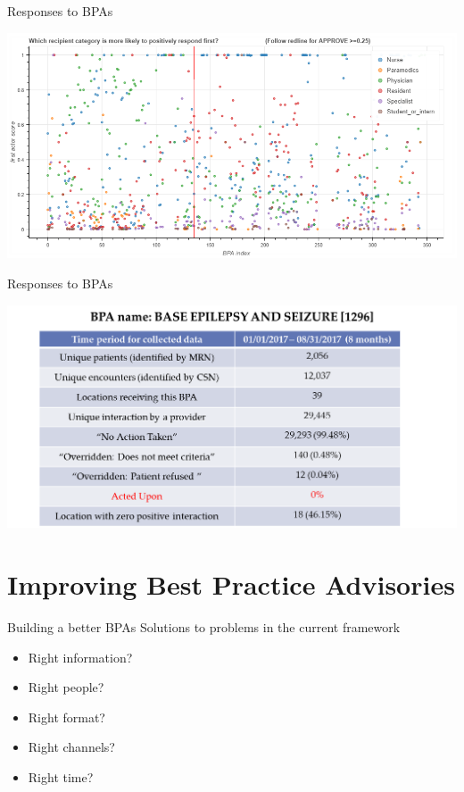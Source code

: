 \documentclass[10pt]{beamer}
\begin{document}
\begin{frame}{Responses to BPAs}
	\begin{center}
		\includegraphics[width=1.1\textwidth, center, trim=0cm 0cm 0cm 0cm]{images/Percentage_first_interaction.png}
	\end{center}
\end{frame}

\begin{frame}{Responses to BPAs}
	\begin{center}
		\includegraphics[width=1.0\textwidth, center, trim=0cm 0cm 0cm 0cm]{images/failed_BPA.png}
	\end{center}
\end{frame}

\section{Improving Best Practice Advisories}

\begin{frame}{Building a better BPAs}
Solutions to problems in the current framework
\pause
\begin{itemize}
	\item Right information?
	\item Right people?
	\item Right format?
	\item Right channels?
	\item Right time?
\end{itemize}
\end{frame}
\end{document}
